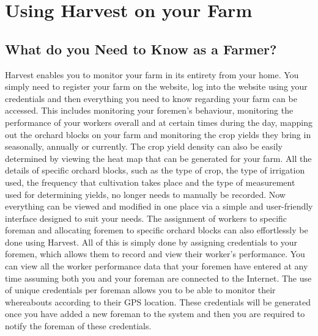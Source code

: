 \documentclass[11pt,fleqn]{book} %
\begin{document}

\chapter{Using Harvest on your Farm}
	\section{What do you Need to Know as a Farmer?}
		
		Harvest enables you to monitor your farm in its entirety from your home. You simply need to register your farm on the website, log into the website using your credentials and then everything you need to know regarding your farm can be accessed. This includes monitoring your foremen's behaviour, monitoring the performance of your workers overall and at certain times during the day, mapping out the orchard blocks on your farm and monitoring the crop yields they bring in seasonally, annually or currently. The crop yield density can also be easily determined by viewing the heat map that can be generated for your farm. All the details of specific orchard blocks, such as the type of crop, the type of irrigation used, the frequency that cultivation takes place and the type of measurement used for determining yields, no longer needs to manually be recorded. Now everything can be viewed and modified in one place via a simple and user-friendly interface designed to suit your needs. The assignment of workers to specific foreman and allocating foremen to specific orchard blocks can also effortlessly be done using Harvest. All of this is simply done by assigning credentials to your foremen, which allows them to record and view their worker's performance. You can view all the worker performance data that your foremen have entered at any time assuming both you and your foreman are connected to the Internet. The use of unique credentials per foreman allows you to be able to monitor their whereabouts according to their GPS location. These credentials will be generated once you have added a new foreman to the system and then you are required to notify the foreman of these credentials.\newline\newline
		
\end{document}

